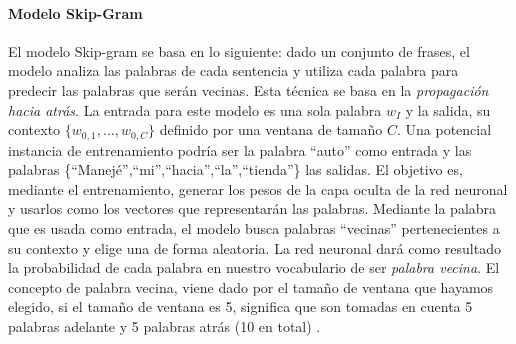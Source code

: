 \paragraph{Modelo Skip-Gram}
El modelo Skip-gram se basa en lo siguiente: dado un conjunto de frases, el modelo analiza las palabras de cada sentencia y utiliza cada palabra para predecir las palabras que serán vecinas. Esta técnica se basa en la \textit{propagación hacia atrás}. La entrada para este modelo es una sola palabra \(w_I\) y la salida, su contexto \(\{w_{0,1},..., w_{0,C}\}\) definido por una ventana de tamaño \(C\). Una potencial instancia de entrenamiento podría ser la palabra “auto” como entrada y las palabras \{``Manejé'',``mi'',``hacia'',``la'',``tienda''\} las salidas. El objetivo es, mediante el entrenamiento, generar los pesos de la capa oculta de la red neuronal y usarlos como los vectores que representarán las palabras. Mediante la palabra que es usada como entrada, el modelo busca palabras “vecinas” pertenecientes a su contexto y elige una de forma aleatoria. La red neuronal dará como resultado la probabilidad de cada palabra en nuestro vocabulario de ser \textit{palabra vecina}. El concepto de palabra vecina, viene dado por el tamaño de ventana que hayamos elegido, si el tamaño de ventana es 5, significa que son tomadas en cuenta 5 palabras adelante y 5 palabras atrás (10 en total) \citep{skipgrammodel}.

